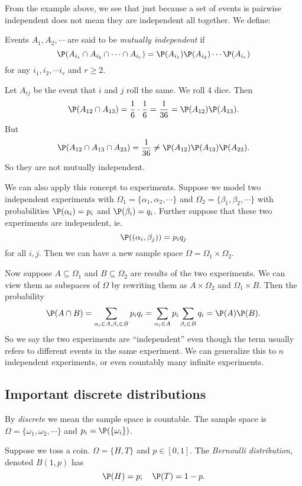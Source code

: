 \documentclass[a4paper]{article}
\begin{document}
From the example above, we see that just because a set of events is pairwise independent does not mean they are independent all together. We define:
\begin{defi}
  Events $A_1, A_2, \cdots$ are said to be \emph{mutually independent} if
  \[
    \P(A_{i_1}\cap A_{i_2} \cap \cdots \cap A_{i_r}) = \P(A_{i_1})\P(A_{i_2})\cdots \P(A_{i_r})
  \]
  for any $i_1, i_2, \cdots i_r$ and $r \geq 2$.
\end{defi}
\begin{eg}
  Let $A_{ij}$ be the event that $i$ and $j$ roll the same. We roll 4 dice. Then
  \[
    \P(A_{12}\cap A_{13}) = \frac{1}{6}\cdot \frac{1}{6} = \frac{1}{36} = \P(A_{12})\P(A_{13}).
  \]
  But
  \[
    \P(A_{12}\cap A_{13}\cap A_{23}) = \frac{1}{36} \not= \P(A_{12})\P(A_{13})\P(A_{23}).
  \]
  So they are not mutually independent.
\end{eg}

We can also apply this concept to experiments. Suppose we model two independent experiments with $\Omega_1 = \{\alpha_1, \alpha_2, \cdots\}$  and $\Omega_2 = \{\beta_1, \beta_2, \cdots\}$ with probabilities $\P(\alpha_i) = p_i$ and $\P(\beta_i) = q_i$. Further suppose that these two experiments are independent, ie.
\[
  \P((\alpha_i, \beta_j)) = p_iq_j
\]
for all $i, j$. Then we can have a new sample space $\Omega = \Omega_1\times \Omega_2$.

Now suppose $A\subseteq \Omega_1$ and $B\subseteq \Omega_2$ are results of the two experiments. We can view them as subspaces of $\Omega$ by rewriting them as $A\times \Omega_2$ and $\Omega_1\times B$. Then the probability
\[
  \P(A\cap B) = \sum_{\alpha_i\in A, \beta_i\in B} p_iq_i = \sum_{\alpha_i\in A} p_i\sum_{\beta_i\in B}q_i = \P(A)\P(B).
\]
So we say the two experiments are ``independent'' even though the term usually refers to different events in the same experiment. We can generalize this to $n$ independent experiments, or even countably many infinite experiments.


\subsection{Important discrete distributions}
By \emph{discrete} we mean the sample space is countable. The sample space is $\Omega = \{\omega_1, \omega_2, \cdots\}$ and $p_i = \P(\{\omega_i\})$.

\begin{defi}
  Suppose we toss a coin. $\Omega=\{H, T\}$ and $p\in [0, 1]$. The \emph{Bernoulli distribution}, denoted $B(1, p)$ has
  \[
    \P(H) = p;\quad \P(T) = 1- p.
  \]
\end{defi}
\end{document}

